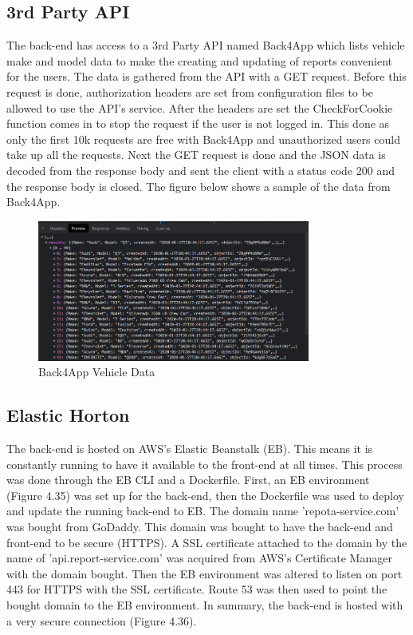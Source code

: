 \subsection{3rd Party API}
The back-end has access to a 3rd Party API named Back4App which lists vehicle make and model data to make the creating and updating of reports convenient for the users. The data is gathered from the API with a GET request. Before this request is done, authorization headers are set from configuration files to be allowed to use the API's service. After the headers are set the CheckForCookie function comes in to stop the request if the user is not logged in. This done as only the first 10k requests are free with Back4App and unauthorized users could take up all the requests. Next the GET request is done and the JSON data is decoded from the response body and sent the client with a status code 200 and the response body is closed. The figure below shows a sample of the data from Back4App.

\begin{figure}[H]
    \caption{Back4App Vehicle Data}
    \label{image:back4app}
    \centering
    \includegraphics[width=0.8\textwidth]{images/horton/back4app/back4app_data.png}
\end{figure}

\subsection{Elastic Horton}
The back-end is hosted on AWS's Elastic Beanstalk (EB). This means it is constantly running to have it available to the front-end at all times. This process was done through the EB CLI and a Dockerfile. First, an EB environment (Figure 4.35) was set up for the back-end, then the Dockerfile was used to deploy and update the running back-end to EB. The domain name 'repota-service.com' was bought from GoDaddy. This domain was bought to have the back-end and front-end to be secure (HTTPS). A SSL certificate attached to the domain by the name of 'api.report-service.com' was acquired from AWS's Certificate Manager with the domain bought. Then the EB environment was altered to listen on port 443 for HTTPS with the SSL certificate. Route 53 was then used to point the bought domain to the EB environment. In summary, the back-end is hosted with a very secure connection (Figure 4.36).

